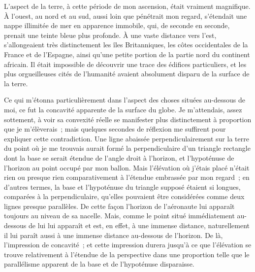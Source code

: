 \documentclass[french,twoside]{book} %
\begin{document}
L’aspect de la terre, à cette période de mon ascension, était vraiment magnifique. À l’ouest, au nord et au sud, aussi loin que pénétrait mon regard, s’étendait une nappe illimitée de mer en apparence immobile, qui, de seconde en seconde, prenait une teinte bleue plus profonde. À une vaste distance vers l’est, s’allongeaient très distinctement les îles Britanniques, les côtes occidentales de la France et de l’Espagne, ainsi qu’une petite portion de la partie nord du continent africain. Il était impossible de découvrir une trace des édifices particuliers, et les plus orgueilleuses cités de l’humanité avaient absolument disparu de la surface de la terre.\par
Ce qui m’étonna particulièrement dans l’aspect des choses situées au-dessous de moi, ce fut la concavité apparente de la surface du globe. Je m’attendais, assez sottement, à voir sa convexité réelle se manifester plus distinctement à proportion que je m’élèverais ; mais quelques secondes de réflexion me suffirent pour expliquer cette contradiction. Une ligne abaissée perpendiculairement sur la terre du point où je me trouvais aurait formé la perpendiculaire d’un triangle rectangle dont la base se serait étendue de l’angle droit à l’horizon, et l’hypoténuse de l’horizon au point occupé par mon ballon. Mais l’élévation où j’étais placé n’était rien ou presque rien comparativement à l’étendue embrassée par mon regard ; en d’autres termes, la base et l’hypoténuse du triangle supposé étaient si longues, comparées à la perpendiculaire, qu’elles pouvaient être considérées comme deux lignes presque parallèles. De cette façon l’horizon de l’aéronaute lui apparaît toujours au niveau de sa nacelle. Mais, comme le point situé immédiatement au-dessous de lui lui apparaît et est, en effet, à une immense distance, naturellement il lui paraît aussi à une immense distance au-dessous de l’horizon. De là, l’impression de concavité ; et cette impression durera jusqu’à ce que l’élévation se trouve relativement à l’étendue de la perspective dans une proportion telle que le parallélisme apparent de la base et de l’hypoténuse disparaisse.\par
\end{document}
